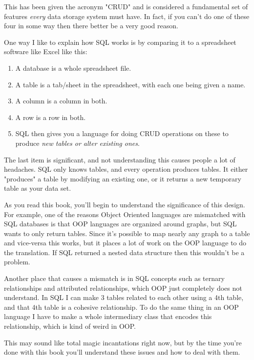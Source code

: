 This has been given the acronym "CRUD" and is considered a fundamental set of
features \emph{every} data storage system must have.  In fact, if you can't do 
one of these four in some way then there better be a very good reason.

One way I like to explain how SQL works is by comparing it to a spreadsheet 
software like Excel like this:

\begin{enumerate}
\item A database is a whole spreadsheet file.
\item A table is a tab/sheet in the spreadsheet, with each one being given a name.
\item A column is a column in both.
\item A row is a row in both.
\item SQL then gives you a language for doing CRUD operations on these to 
    produce \emph{new tables or alter existing ones}.
\end{enumerate}

The last item is significant, and not understanding this causes people a lot of headaches.
SQL only knows tables, and every operation produces tables.  It either "produces" a table
by modifying an existing one, or it returns a new temporary table as your data set.

As you read this book, you'll begin to understand the significance of this design.  For
example, one of the reasons Object Oriented languages are mismatched with SQL databases
is that OOP languages are organized around graphs, but SQL wants to only return tables.
Since it's possible to map nearly any graph to a table and vice-versa this works, but
it places a lot of work on the OOP language to do the translation.  If SQL returned
a nested data structure then this wouldn't be a problem.

Another place that causes a mismatch is in SQL concepts such as ternary
relationships and attributed relationships, which OOP just completely does not
understand.  In SQL I can make 3 tables related to each other using a 4th
table, and that 4th table is a cohesive relationship.  To do the same thing in
an OOP language I have to make a whole intermediary class that encodes this
relationship, which is kind of weird in OOP.

This may sound like total magic incantations right now, but by the time you're
done with this book you'll understand these issues and how to deal with them.


